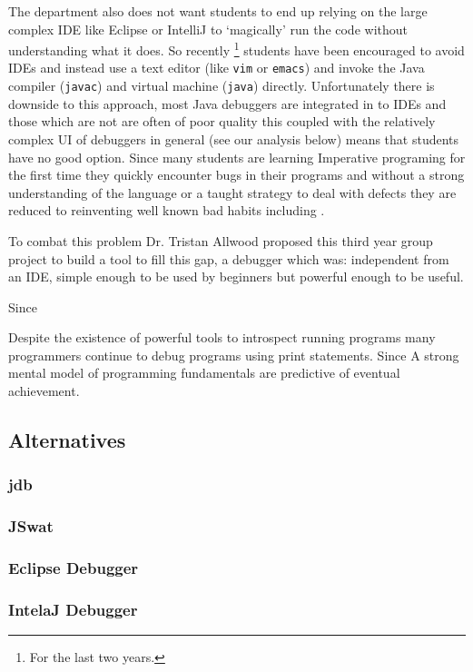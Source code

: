 \documentclass[11pt, a4paper]{article}
\newcommand{\cmd}[1]{{\tt #1}}
\begin{document}
The department also does not want students to end up relying on the large complex IDE like Eclipse or IntelliJ to `magically' run the code without understanding what it does.
So recently  \footnote{For the last two years.} students have been encouraged to avoid IDEs and instead use a text editor (like \cmd{vim} or \cmd{emacs}) and invoke the Java compiler (\cmd{javac}) and virtual machine (\cmd{java}) directly.
Unfortunately there is downside to this approach, most Java debuggers are integrated in to IDEs and those which are not are often of poor quality this coupled with the relatively complex UI of debuggers in general (see our analysis below) means that students have no good option.
Since many students are learning Imperative programing for the first time they quickly encounter bugs in their programs and without a strong understanding of the language or a taught strategy to deal with defects they are reduced to reinventing well known bad habits including .

To combat this problem Dr. Tristan Allwood proposed this third year group project to build a tool to fill this gap, a debugger which was: independent from an IDE, simple enough to be used by beginners but powerful enough to be useful.

Since 

Despite the existence of powerful tools to introspect running programs many programmers continue to debug programs using print statements.
Since 
A strong mental model of programming fundamentals are predictive of eventual achievement.

\subsection{Alternatives}
\subsubsection{jdb}
\subsubsection{JSwat}
\subsubsection{Eclipse Debugger}
\subsubsection{IntelaJ Debugger}
\end{document}
